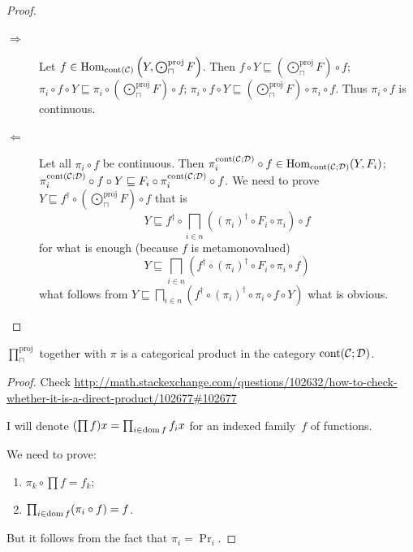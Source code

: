 \begin{proof}
  ~
  \begin{description}
    \item[$\Rightarrow$] Let $f \in \operatorname{Hom}_{\operatorname{cont}
    (\mathcal{C})} \left( Y , \bigodot^{\text{proj}}_{\sqcap} F \right)$. Then $f \circ Y
    \sqsubseteq \left( \bigodot^{\text{proj}}_{\sqcap} F \right) \circ f$; $\pi_i \circ f \circ Y
    \sqsubseteq \pi_i \circ \left( \bigodot^{\text{proj}}_{\sqcap} F \right) \circ f$; $\pi_i
    \circ f \circ Y \sqsubseteq \left( \bigodot^{\text{proj}}_{\sqcap} F \right) \circ \pi_i \circ
    f$. Thus $\pi_i \circ f$ is continuous.
    
    \item[$\Leftarrow$] Let all $\pi_i \circ f$ be continuous. Then
    $\pi^{\operatorname{cont}(\mathcal C;\mathcal D)}_i \circ f \in
    \operatorname{Hom}_{\operatorname{cont}(\mathcal C;\mathcal D)} (Y , F_i)$;
    $\pi^{\operatorname{cont}(\mathcal C;\mathcal D)}_i \circ f \circ Y \sqsubseteq
    F_i \circ \pi^{\operatorname{cont}(\mathcal C;\mathcal D)}_i \circ f$. We need
    to prove $Y \sqsubseteq f^{\dagger} \circ \left( \bigodot^{\text{proj}}_{\sqcap} F \right)
    \circ f$ that is
    \[ Y \sqsubseteq f^{\dagger} \circ \bigsqcap_{i \in n} ((\pi_i)^{\dagger}
       \circ F_i \circ \pi_i) \circ f \]
    for what is enough (because $f$ is metamonovalued)
    \[ Y \sqsubseteq \bigsqcap_{i \in n} (f^{\dagger} \circ (\pi_i)^{\dagger}
       \circ F_i \circ \pi_i \circ f) \]
    what follows from $Y \sqsubseteq \bigsqcap_{i \in n} (f^{\dagger} \circ
    (\pi_i)^{\dagger} \circ \pi_i \circ f \circ Y)$ what is obvious.
  \end{description}
\end{proof}

\begin{thm}\label{cont-pr-pr}
$\prod^{\text{proj}}_{\sqcap}$ together with $\pi$ is a categorical product in the category $\operatorname{cont}(\mathcal C;\mathcal D)$.
\end{thm}

\begin{proof}
Check
\url{http://math.stackexchange.com/questions/102632/how-to-check-whether-it-is-a-direct-product/102677\#102677}

I will denote $(\prod f)x=\prod_{i\in\operatorname{dom} f}f_i x$ for an
indexed family~$f$ of functions.

We need to prove:
\begin{enumerate}
\item $\pi_k\circ\prod f=f_k$;
\item $\prod_{i\in\operatorname{dom} f}(\pi_i\circ f)=f$.
\end{enumerate}
But it follows from the fact that $\pi_i=\Pr_i$.
\end{proof}


